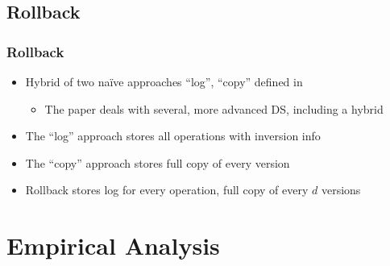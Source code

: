 \documentclass{beamer}
\begin{document}
\begin{frame}
\begin{figure}
\end{figure}
\end{frame}

\subsection{Rollback}
\begin{frame}
\frametitle{Rollback}
\begin{itemize}
  \item Hybrid of two na\"ive approaches ``log'', ``copy'' defined in \cite{Tsotras1995237}
  \begin{itemize}
    \item The paper deals with several, more advanced DS, including a hybrid
  \end{itemize}
  \pause
  \item The ``log'' approach stores all operations with inversion info
  \pause
  \item The ``copy'' approach stores full copy of every version
  \pause
  \item Rollback stores log for every operation, full copy of every $d$ versions
\end{itemize}
\end{frame}

\section{Empirical Analysis}
\end{document}
